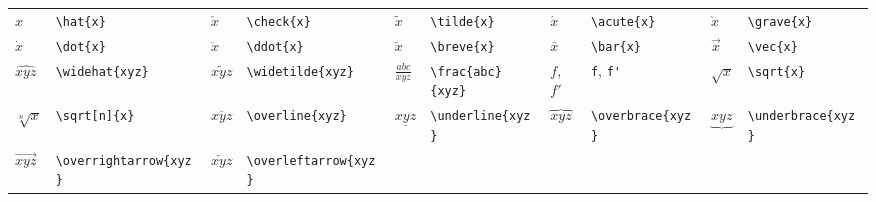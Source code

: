 \documentclass[10pt, english]{article}
\begin{document}
	\begin{center}
		\scriptsize
	\begin{tabular}{ll|ll|ll|ll|ll}
		$\hat{x}$ & \verb|\hat{x}| & $\check{x}$ & \verb|\check{x}| & $\tilde{x}$ & \verb|\tilde{x}| & $\acute{x}$ & \verb|\acute{x}| & $\grave{x}$ & \verb|\grave{x}|\\
		$\dot{x}$ & \verb|\dot{x}| & $\ddot{x}$ & \verb|\ddot{x}| & $\breve{x}$ & \verb|\breve{x}| & $\bar{x}$ & \verb|\bar{x}| & $\vec{x}$ & \verb|\vec{x}|\\
		$\widehat{xyz}$ & \verb|\widehat{xyz}| & $\widetilde{xyz}$ & \verb|\widetilde{xyz}| & $\frac{abc}{xyz}$ & \verb|\frac{abc}{xyz}| & $f$, $f'$ & \verb|f|, \verb|f'| & $\sqrt{x}$ & \verb|\sqrt{x}|\\
		$\sqrt[n]{x}$ & \verb|\sqrt[n]{x}| & $\overline{xyz}$ & \verb|\overline{xyz}| & $\underline{xyz}$ & \verb|\underline{xyz}| & $\overbrace{xyz}$ & \verb|\overbrace{xyz}| & $\underbrace{xyz}$ & \verb|\underbrace{xyz}|\\
		$\overrightarrow{xyz}$ & \verb|\overrightarrow{xyz}| & $\overleftarrow{xyz}$ & \verb|\overleftarrow{xyz}| \\
	\end{tabular}
	\end{center}
\end{document}

